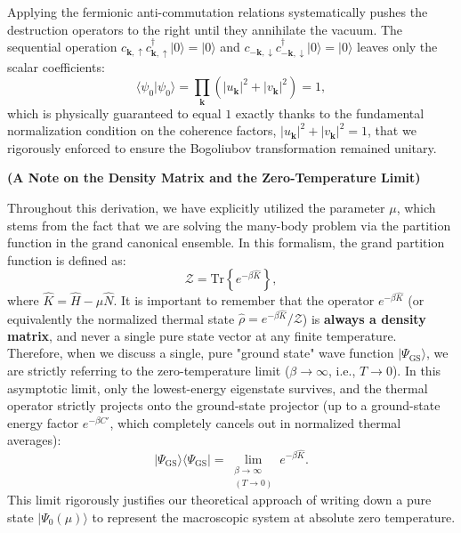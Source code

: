 Applying the fermionic anti-commutation relations systematically pushes the destruction operators to the right until they annihilate the vacuum. The sequential operation \( c_{\mathbf{k},\uparrow} c_{\mathbf{k},\uparrow}^\dagger |0\rangle = |0\rangle \) and \( c_{-\mathbf{k},\downarrow} c_{-\mathbf{k},\downarrow}^\dagger |0\rangle = |0\rangle \) leaves only the scalar coefficients:
\[
    \langle \psi_0 | \psi_0 \rangle = \prod_{\mathbf{k}} \left( |u_{\mathbf{k}}|^2 + |v_{\mathbf{k}}|^2 \right) = 1,
\]
which is physically guaranteed to equal \( 1 \) exactly thanks to the fundamental normalization condition on the coherence factors, \( |u_{\mathbf{k}}|^2 + |v_{\mathbf{k}}|^2 = 1 \), that we rigorously enforced to ensure the Bogoliubov transformation remained unitary.

\begin{remark}
    \textbf{(A Note on the Density Matrix and the Zero-Temperature Limit)}

    Throughout this derivation, we have explicitly utilized the parameter \( \mu \), which stems from the fact that we are solving the many-body problem via the partition function in the grand canonical ensemble. In this formalism, the grand partition function is defined as:
    \[
        \mathcal{Z} = \text{Tr}\left\{e^{-\beta \hat{K}}\right\},
    \]
    where \( \hat{K} = \hat{H} - \mu \hat{N} \). It is important to remember that the operator \( e^{-\beta \hat{K}} \) (or equivalently the normalized thermal state \( \hat{\rho} = e^{-\beta \hat{K}} / \mathcal{Z} \)) is \textbf{always a density matrix}, and never a single pure state vector at any finite temperature. Therefore, when we discuss a single, pure "ground state" wave function \( |\Psi_{\text{GS}}\rangle \), we are strictly referring to the zero-temperature limit (\( \beta \to \infty \), i.e., \( T \to 0 \)). In this asymptotic limit, only the lowest-energy eigenstate survives, and the thermal operator strictly projects onto the ground-state projector (up to a ground-state energy factor \( e^{-\beta C'} \), which completely cancels out in normalized thermal averages):
    \[
        |\Psi_{\text{GS}}\rangle\langle\Psi_{\text{GS}}| = \lim_{\substack{\beta \to \infty \\ (T \to 0)}} e^{-\beta \hat{K}}.
    \]
    This limit rigorously justifies our theoretical approach of writing down a pure state \( |\Psi_0(\mu)\rangle \) to represent the macroscopic system at absolute zero temperature.
\end{remark}